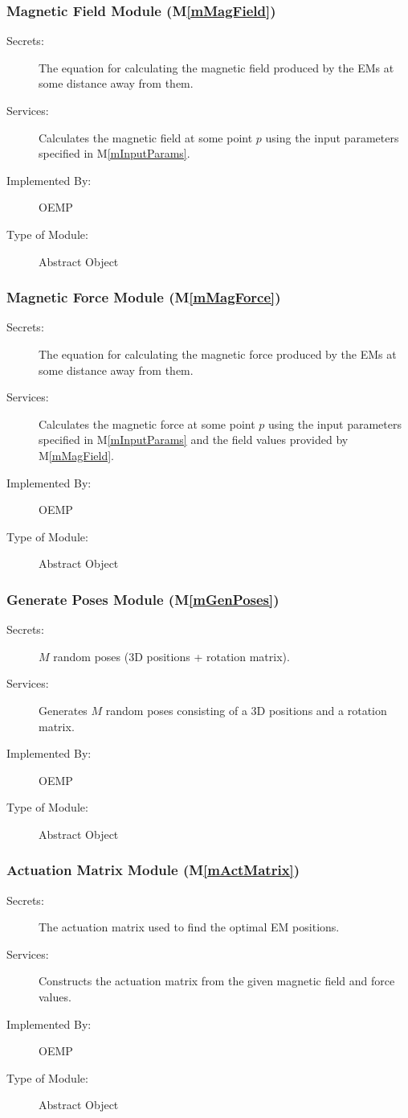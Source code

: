 \documentclass[12pt, titlepage]{article}
\newcommand{\mref}[1]{M\ref{#1}}
\begin{document}
\subsubsection{Magnetic Field Module (\mref{mMagField})}
\begin{description}
  \item[Secrets:]The equation for calculating the magnetic field produced by the EMs at some distance away from them.
  \item[Services:]Calculates the magnetic field at some point $p$ using the input parameters specified in \mref{mInputParams}. 
  \item[Implemented By:] OEMP
  \item[Type of Module:] Abstract Object
\end{description}

\subsubsection{Magnetic Force Module (\mref{mMagForce})}
\begin{description}
  \item[Secrets:]The equation for calculating the magnetic force produced by the EMs at some distance away from them.
  \item[Services:]Calculates the magnetic force at some point $p$ using the input parameters specified in \mref{mInputParams} and the field values provided by \mref{mMagField}. 
  \item[Implemented By:] OEMP
  \item[Type of Module:] Abstract Object
\end{description}

\subsubsection{Generate Poses Module (\mref{mGenPoses})}
\begin{description}
  \item[Secrets:]$M$ random poses (3D positions + rotation matrix).
  \item[Services:]Generates $M$ random poses consisting of a 3D positions and a rotation matrix. 
  \item[Implemented By:] OEMP
  \item[Type of Module:] Abstract Object
\end{description}

\subsubsection{Actuation Matrix Module (\mref{mActMatrix})}
\begin{description}
  \item[Secrets:]The actuation matrix used to find the optimal EM positions.
  \item[Services:]Constructs the actuation matrix from the given magnetic field and force values. 
  \item[Implemented By:] OEMP
  \item[Type of Module:] Abstract Object
\end{description}
\end{document}
